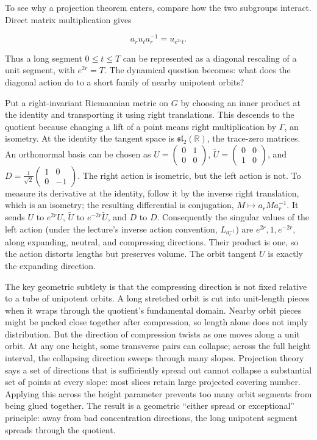 To see why a projection theorem enters, compare how the two subgroups interact. Direct matrix multiplication gives

\[ a_r u_t a_r^{-1}=u_{e^{2r}t}. \]

Thus a long segment \(0\leq t\leq T\) can be represented as a diagonal rescaling of a unit segment, with \(e^{2r}=T\). The dynamical question becomes: what does the diagonal action do to a short family of nearby unipotent orbits?

Put a right-invariant Riemannian metric on \(G\) by choosing an inner product at the identity and transporting it using right translations. This descends to the quotient because changing a lift of a point means right multiplication by \(\Gamma\), an isometry. At the identity the tangent space is \(\mathfrak{sl}_2(\mathbb R)\), the trace-zero matrices. An orthonormal basis can be chosen as \(U=\begin{pmatrix}0&1\\0&0\end{pmatrix}\), \(\widetilde U=\begin{pmatrix}0&0\\1&0\end{pmatrix}\), and \(D=\frac1{\sqrt2}\begin{pmatrix}1&0\\0&-1\end{pmatrix}\). The right action is isometric, but the left action is not. To measure its derivative at the identity, follow it by the inverse right translation, which is an isometry; the resulting differential is conjugation, \(M\mapsto a_r M a_r^{-1}\). It sends \(U\) to \(e^{2r}U\), \(\widetilde U\) to \(e^{-2r}\widetilde U\), and \(D\) to \(D\). Consequently the singular values of the left action (under the lecture's inverse action convention, \(L_{a_r^{-1}}\)) are \(e^{2r},1,e^{-2r}\), along expanding, neutral, and compressing directions. Their product is one, so the action distorts lengths but preserves volume. The orbit tangent \(U\) is exactly the expanding direction.

The key geometric subtlety is that the compressing direction is not fixed relative to a tube of unipotent orbits. A long stretched orbit is cut into unit-length pieces when it wraps through the quotient's fundamental domain. Nearby orbit pieces might be packed close together after compression, so length alone does not imply distribution. But the direction of compression twists as one moves along a unit orbit. At any one height, some transverse pairs can collapse; across the full height interval, the collapsing direction sweeps through many slopes. Projection theory says a set of directions that is sufficiently spread out cannot collapse a substantial set of points at every slope: most slices retain large projected covering number. Applying this across the height parameter prevents too many orbit segments from being glued together. The result is a geometric ``either spread or exceptional'' principle: away from bad concentration directions, the long unipotent segment spreads through the quotient.

